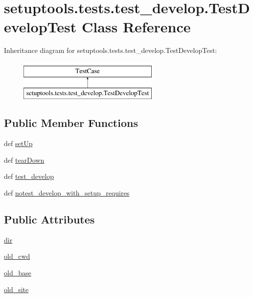 \hypertarget{classsetuptools_1_1tests_1_1test__develop_1_1TestDevelopTest}{}\section{setuptools.\+tests.\+test\+\_\+develop.\+Test\+Develop\+Test Class Reference}
\label{classsetuptools_1_1tests_1_1test__develop_1_1TestDevelopTest}
Inheritance diagram for setuptools.\+tests.\+test\+\_\+develop.\+Test\+Develop\+Test\+:\begin{figure}[H]
\begin{center}
\leavevmode
\includegraphics[height=2.000000cm]{classsetuptools_1_1tests_1_1test__develop_1_1TestDevelopTest}
\end{center}
\end{figure}
\subsection*{Public Member Functions}
\begin{DoxyCompactItemize}
\item 
def \hyperlink{classsetuptools_1_1tests_1_1test__develop_1_1TestDevelopTest_a6b32b17d00c1174279c15050eb7e6b75}{set\+Up}
\item 
def \hyperlink{classsetuptools_1_1tests_1_1test__develop_1_1TestDevelopTest_ad9a933e5fb11d4b6ac934c9e7bf4e11d}{tear\+Down}
\item 
def \hyperlink{classsetuptools_1_1tests_1_1test__develop_1_1TestDevelopTest_a39e7b53a7e24e75ed8ca03cceb43fb8d}{test\+\_\+develop}
\item 
def \hyperlink{classsetuptools_1_1tests_1_1test__develop_1_1TestDevelopTest_ada7f7b26bbf0cbc873ed209369e130e7}{notest\+\_\+develop\+\_\+with\+\_\+setup\+\_\+requires}
\end{DoxyCompactItemize}
\subsection*{Public Attributes}
\begin{DoxyCompactItemize}
\item 
\hyperlink{classsetuptools_1_1tests_1_1test__develop_1_1TestDevelopTest_af73454cedf0eb85bf317b03389ae3ad9}{dir}
\item 
\hyperlink{classsetuptools_1_1tests_1_1test__develop_1_1TestDevelopTest_aeb69073fa1331d4a18ba773212f03370}{old\+\_\+cwd}
\item 
\hyperlink{classsetuptools_1_1tests_1_1test__develop_1_1TestDevelopTest_a5e022571c0387fd6d08d03633456366c}{old\+\_\+base}
\item 
\hyperlink{classsetuptools_1_1tests_1_1test__develop_1_1TestDevelopTest_acd4e39955f8ca124bf04e6a413d07bf7}{old\+\_\+site}
\end{DoxyCompactItemize}


